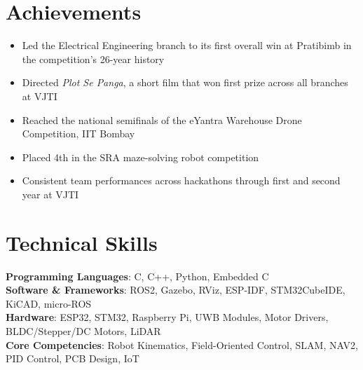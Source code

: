 \documentclass[a4paper,11pt]{article}
\newcommand{\resumeItem}[1]{
  \item\small{
    {#1 \vspace{-2pt}}
  }
}
\begin{document}
\section{Achievements}
 \begin{itemize}[leftmargin=0.3in, label=\textendash]
    \resumeItem{Led the Electrical Engineering branch to its first overall win at Pratibimb in the competition's 26-year history}
    \resumeItem{Directed \emph{Plot Se Panga}, a short film that won first prize across all branches at VJTI}
    \resumeItem{Reached the national semifinals of the eYantra Warehouse Drone Competition, IIT Bombay}
    \resumeItem{Placed 4th in the SRA maze-solving robot competition}
    \resumeItem{Consistent team performances across hackathons through first and second year at VJTI}
 \end{itemize}\vspace{-7pt}

\section{Technical Skills}
 \begin{itemize}[leftmargin=0.15in, label={}]
    \small{\item{
     \textbf{Programming Languages}{: C, C++, Python, Embedded C} \\
     \textbf{Software \& Frameworks}{: ROS2, Gazebo, RViz, ESP-IDF, STM32CubeIDE, KiCAD, micro-ROS} \\
     \textbf{Hardware}{: ESP32, STM32, Raspberry Pi, UWB Modules, Motor Drivers, BLDC/Stepper/DC Motors, LiDAR} \\
     \textbf{Core Competencies}{: Robot Kinematics, Field-Oriented Control, SLAM, NAV2, PID Control, PCB Design, IoT}
    }}
 \end{itemize}
\end{document}

